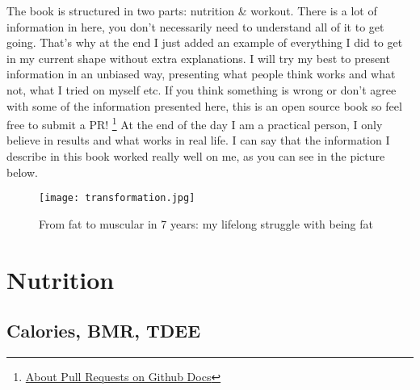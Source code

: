 \documentclass[openany, 12pt]{book}
\begin{document}
	The book is structured in two parts: nutrition \& workout. There is a lot of information in here, you don't necessarily need to understand all of it
	to get going. That's why at the end I just added an example of everything I did to get in my current shape without extra explanations. I will try 
	my best to present information in an unbiased way, presenting what people think works and what not, what I tried on myself etc. If you think 
	something is wrong or don't agree with some of the information presented here, this is an open source book so feel free to submit a PR!
        \footnote{\href{https://docs.github.com/en/free-pro-team@latest/github/collaborating-with-issues-and-pull-requests/about-pull-requests}
	{About Pull Requests on Github Docs}} At the end of the day I am a practical person, I only believe in results and what works in real life. 
	I can say that the information I describe in this book worked really well on me, as you can see in the picture below.
	
	\begin{figure}[h]
		\centering
		\texttt{[image: transformation.jpg]}
		\caption{From fat to muscular in 7 years: my lifelong struggle with being fat}
		\label{fig1}
	\end{figure}
	
	
  \chapter{Nutrition}
  
  	\section{Calories, BMR, TDEE}
  	
\end{document}
